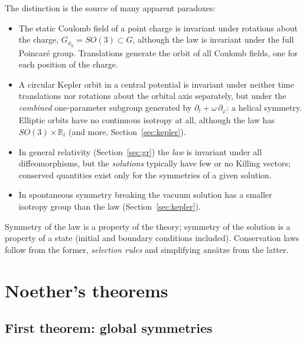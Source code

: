 \documentclass[11pt,a4paper,openany]{book}
\theoremstyle{definition}
\theoremstyle{plain}
\theoremstyle{remark}
\begin{document}
The distinction is the source of many apparent paradoxes:
\begin{itemize}[leftmargin=1.6em,itemsep=2pt]
\item The static Coulomb field of a point charge is invariant under rotations
  about the charge, $G_{\phi_0}=SO(3)\subset G$, although the law is invariant
  under the full Poincar\'e group. Translations generate the orbit of all
  Coulomb fields, one for each position of the charge.
\item A circular Kepler orbit in a central potential is invariant under
  neither time translations nor rotations about the orbital axis separately,
  but under the \emph{combined} one-parameter subgroup generated by
  $\partial_t+\omega\,\partial_\varphi$: a helical symmetry. Elliptic orbits
  have no continuous isotropy at all, although the law has $SO(3)\times
  \mathbb R_t$ (and more, Section~\ref{sec:kepler}).
\item In general relativity (Section~\ref{sec:gr}) the \emph{law} is invariant
  under all diffeomorphisms, but the \emph{solutions} typically have few or no
  Killing vectors; conserved quantities exist only for the symmetries of a
  given solution.
\item In spontaneous symmetry breaking the vacuum solution has a smaller
  isotropy group than the law (Section~\ref{sec:kepler}).
\end{itemize}
Symmetry of the law is a property of the theory; symmetry of the solution is a
property of a state (initial and boundary conditions included). Conservation
laws follow from the former, \emph{selection rules} and simplifying ans\"atze
from the latter.

\section{Noether's theorems}
\label{sec:noether}

\subsection{First theorem: global symmetries}
\end{document}
